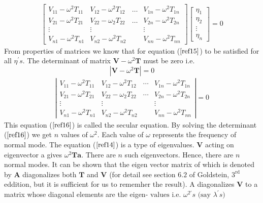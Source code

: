  \begin{align}
 \left[\begin{array}{cccc}
 V_{11}-\omega^{2} T_{11} & V_{12}-\omega^{2} T_{12} & \ldots & V_{1 n}-\omega^{2} T_{1 n} \\
 V_{21}-\omega^{2} T_{21} & V_{22}-\omega_{2} T_{22} & \ldots & V_{2 n}-\omega^{2} T_{2 n} \\
 \vdots & \vdots & & \vdots \\
 V_{n 1}-\omega^{2} T_{n 1} & V_{n 2}-\omega^{2} T_{n 2} & & V_{n n}-\omega^{2} T_{n n}
 \end{array}\right]\left[\begin{array}{l}
 \eta_{1} \\
 \eta_{2} \\
 \vdots \\
 \eta_{n}
 \end{array}\right]=0\label{ref15}
 \end{align}
 From properties of matrices we know that for equation ($\ref{ref15}$) to be satisfied for all $\eta^{\prime} s$. The determinant of matrix $\mathbf{V}-\omega^{2} \mathbf{T}$ must be zero i.e.
 $$
 \left|\mathbf{V}-\omega^{2} \mathbf{T}\right|=0
 $$
 \begin{align}
 \left|\begin{array}{cccc}
 V_{11}-\omega^{2} T_{11} & V_{12}-\omega^{2} T_{12} & \cdots & V_{1 n}-\omega^{2} T_{1 n} \\
 V_{21}-\omega^{2} T_{21} & V_{22}-\omega_{2} T_{22} & \cdots & V_{2 n}-\omega^{2} T_{2 n} \\
 \vdots & \vdots & & \vdots \\
 V_{n 1}-\omega^{2} T_{n 1} & V_{n 2}-\omega^{2} T_{n 2} & & V_{n n}-\omega^{2} T_{n n}
 \end{array}\right|=0\label{ref16}
 \end{align}
  This equation ($\ref*{ref16}$) is called the secular equation.
  By solving the determinant ($\ref{ref16}$) we get $n$ values of $\omega^{2}$. Each value of $\omega$ represents the frequency of normal mode. The equation ($\ref{ref14}$) is a type of eigenvalues. $\mathbf{V}$ acting on eigenvector a gives $\omega^{2} \mathbf{T a}$. There are $n$ such eigenvectors. Hence, there are $n$ normal modes. It can be shown that the eigen vector matrix of which is denoted by $\mathbf{A}$ diagonalizes both $\mathbf{T}$ and $\mathbf{V}$ (for detail see section $6.2$ of Goldstein, $3^{\text {rd }}$ eddition, but it is sufficient for us to rememher the result). A diagonalizes $\mathbf{V}$ to a matrix whose diagonal elements are the eigen-$\text { values i.e. } \omega^{2 \prime} s \text { (say } \lambda^{\prime} s)$\\
